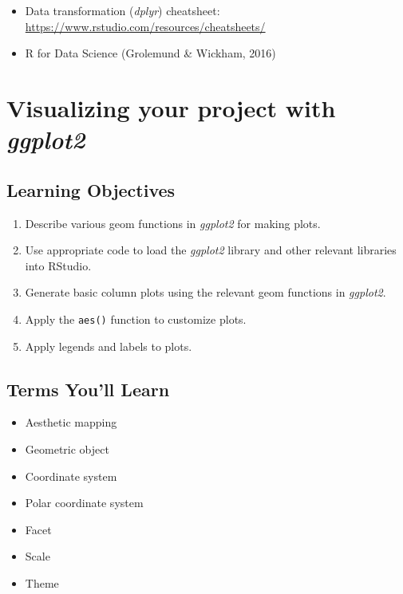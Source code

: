 \documentclass[
  krantz2]{krantz}
\providecommand{\tightlist}{%
  \setlength{\itemsep}{0pt}\setlength{\parskip}{0pt}}
\begin{document}
\begin{itemize}
\tightlist
\item
  Data transformation (\emph{dplyr}) cheatsheet: \url{https://www.rstudio.com/resources/cheatsheets/}
\item
  R for Data Science (Grolemund \& Wickham, 2016)
\end{itemize}

\hypertarget{ggplot2}{%
\chapter{\texorpdfstring{Visualizing your project with \emph{ggplot2}}{Visualizing your project with ggplot2}}\label{ggplot2}}

\hypertarget{ggplot-los}{%
\section{Learning Objectives}\label{ggplot-los}}

\begin{enumerate}
\def\labelenumi{\arabic{enumi}.}
\tightlist
\item
  Describe various geom functions in \emph{ggplot2} for making plots.
\item
  Use appropriate code to load the \emph{ggplot2} library and other relevant libraries into RStudio.
\item
  Generate basic column plots using the relevant geom functions in \emph{ggplot2}.
\item
  Apply the \texttt{aes()} function to customize plots.
\item
  Apply legends and labels to plots.
\end{enumerate}

\hypertarget{ggplot-terms}{%
\section{Terms You'll Learn}\label{ggplot-terms}}

\begin{itemize}
\tightlist
\item
  Aesthetic mapping
\item
  Geometric object
\item
  Coordinate system
\item
  Polar coordinate system
\item
  Facet
\item
  Scale
\item
  Theme
\end{itemize}
\end{document}
